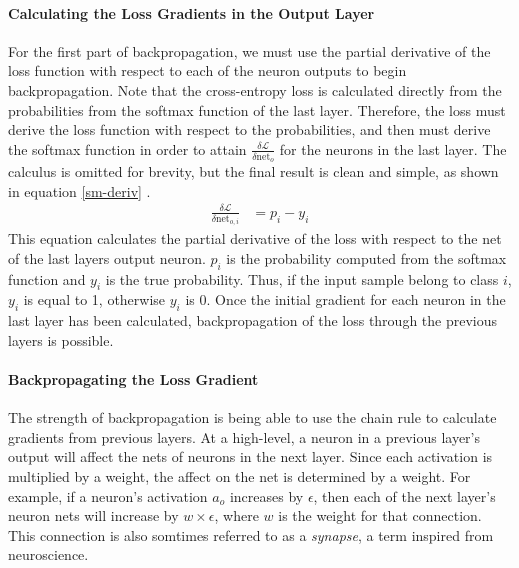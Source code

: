 \paragraph{Calculating the Loss Gradients in the Output Layer}
For the first part of backpropagation, we must use the partial derivative of the loss function with respect to each of the neuron outputs to begin backpropagation. Note that the cross-entropy loss is calculated directly from the probabilities from the softmax function of the last layer. Therefore, the loss must derive the loss function with respect to the probabilities, and then must derive the softmax function in order to attain $\frac{\delta \mathcal{L}}{\delta \text{net}_o}$ for the neurons in the last layer. The calculus is omitted for brevity, but the final result is clean and simple, as shown in equation \ref{sm-deriv} \cite{sm-derivative}. 
\begin{align}
\frac{\delta \mathcal{L}}{\delta \text{net}_{o,i}} &= p_i - y_i	\label{sm-deriv}
\end{align}
This equation calculates the partial derivative of the loss with respect to the net of the last layers output neuron. $p_i$ is the probability computed from the softmax function and $y_i$ is the true probability. Thus, if the input sample belong to class $i$, $y_i$ is equal to 1, otherwise $y_i$ is 0. Once the initial gradient for each neuron in the last layer has been calculated, backpropagation of the loss through the previous layers is possible.

\paragraph{Backpropagating the Loss Gradient}
The strength of backpropagation is being able to use the chain rule to calculate gradients from previous layers. At a high-level, a neuron in a previous layer's output will affect the nets of neurons in the next layer. Since each activation is multiplied by a weight, the affect on the net is determined by a weight. For example, if a neuron's activation $a_o$ increases by $\epsilon$, then each of the next layer's neuron nets will increase by $w\times \epsilon$, where $w$ is the weight for that connection. This connection is also somtimes referred to as a \textit{synapse}, a term inspired from neuroscience.

